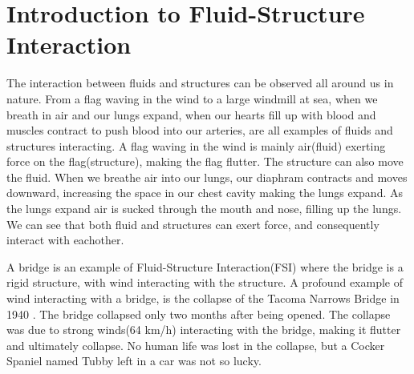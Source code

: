 \chapter{Introduction to Fluid-Structure Interaction}
The interaction between fluids and structures can be observed all around us in nature.
From a flag waving in the wind to a large windmill at sea, when we breath in air and our lungs expand, when our hearts fill up with blood and muscles contract to push blood into our arteries, are all examples of fluids and structures interacting. A flag waving in the wind is mainly air(fluid) exerting force on the flag(structure), making the flag flutter. The structure can also move the fluid. 
When we breathe air into our lungs, our diaphram contracts and moves downward, increasing the space in our chest cavity making the lungs expand. As the lungs expand air is sucked through the mouth and nose, filling up the lungs. We can see that both fluid and structures can exert force, and consequently interact with eachother. 

A bridge is an example of Fluid-Structure Interaction(FSI) where the bridge is a rigid structure, with wind interacting with the structure.
A profound example of wind interacting with a bridge, is the collapse of the Tacoma Narrows Bridge in 1940 \cite{Billah1991}. The bridge collapsed only two months after being opened. The collapse was due to strong winds(64 km/h) interacting with the bridge, making it flutter and ultimately collapse. No human life was lost in the collapse, but a Cocker Spaniel named Tubby left in a car was not so lucky. \newline

